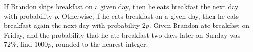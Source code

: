 If Brandon skips breakfast on a given day, then he eats breakfast the next day with probability $p$. Otherwise, if he eats breakfast on a given day, then he eats breakfast again the next day with probability $2p$. Given Brandon ate breakfast on Friday, and the probability that he ate breakfast two days later on Sunday was $72\%$, find $1000p$, rounded to the nearest integer.
